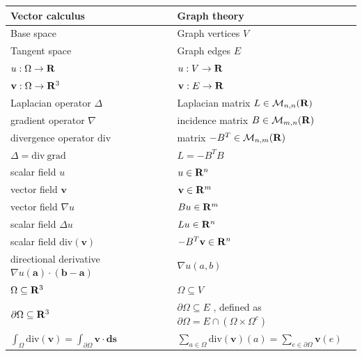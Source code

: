 \begin{tabular}{l|l}
	
		Vector calculus&
		Graph theory\\\hline
	
		Base space&
		Graph vertices $V$\\
	
		Tangent space&
		Graph edges $E$\\
	
		$u:\Omega\to\mathbf{R}$&
		$u:V\to\mathbf{R}$\\
	
		$\mathbf{v}:\Omega\to\mathbf{R}^3$&
		$\mathbf{v}:E\to\mathbf{R}$\\
	
		Laplacian operator $\Delta$&
		Laplacian matrix $L\in\mathcal{M}_{n,n}(\mathbf{R})$\\
	
		gradient operator $\nabla$&
		incidence matrix $B\in\mathcal{M}_{m,n}(\mathbf{R})$\\
	
		divergence operator $\mathrm{div}$&
		matrix $-B^T\in\mathcal{M}_{n,m}(\mathbf{R})$\\
	
		$\Delta=\mathrm{div\ grad}$&
		$L=-B^T B$\\
	
		scalar field $u$&
		$u\in\mathbf{R}^n$\\
	
		vector field $\mathbf{v}$&
		$\mathbf{v}\in\mathbf{R}^m$\\
	
		vector field $\nabla u$&
		$Bu\in\mathbf{R}^m$\\
	
		scalar field $\Delta u$&
		$Lu\in\mathbf{R}^n$\\
	
		scalar field $\mathrm{div}(\mathbf{v})$&
		$-B^T\mathbf{v}\in\mathbf{R}^n$\\
	
		directional derivative $\nabla
			u(\mathbf{a})\cdot(\mathbf{b}-\mathbf{a})$&
		$\nabla u (a,b)$\\
	
		$\Omega\subseteq\mathbf{R}^3$&
		$\Omega\subseteq V$\\
	
		$\partial\Omega\subseteq\mathbf{R}^3$&
		$\partial\Omega\subseteq E$ ,
			defined as $\partial\Omega=E\cap(\Omega\times\Omega^c)$\\
	
		$\displaystyle\int_\Omega\mathrm{div}(\mathbf{v})
			=
			\int_{\partial\Omega}\mathbf{v\cdot ds}$&
		$\displaystyle\sum_{a\in\Omega}\mathrm{div}(\mathbf{v})(a)
			=
			\sum_{e\in\partial\Omega}\mathbf{v}(e)$\\
	

\end{tabular}
